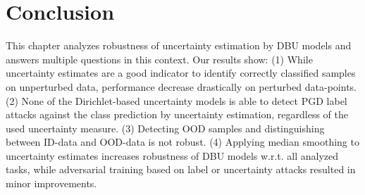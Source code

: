 \section{Conclusion}
\label{sec:conclusion_008}

This chapter analyzes robustness of uncertainty estimation by DBU models and answers multiple questions in this context. Our results show: (1) While uncertainty estimates are a good indicator to identify correctly classified samples on unperturbed data, performance decrease drastically on perturbed data-points. (2) None of the Dirichlet-based uncertainty models is able to detect PGD label attacks against the class prediction by uncertainty estimation, regardless of the used uncertainty measure. (3) Detecting OOD samples and distinguishing between ID-data and OOD-data is not robust. (4) Applying median smoothing to  uncertainty estimates increases robustness of DBU models w.r.t. all analyzed tasks, while adversarial training based on label or uncertainty attacks resulted in minor improvements. 




